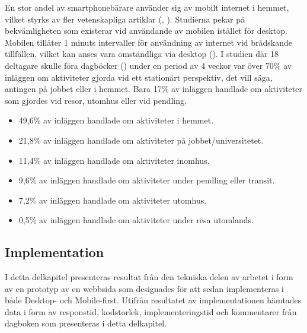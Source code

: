 \documentclass[11pt]{article}
\begin{document}
En stor andel av smartphonebärare använder sig av mobilt internet i hemmet, vilket styrks av fler vetenskapliga artiklar (\cite{mobilewebsearch}, \cite{mobilefirstluke}). Studierna pekar på bekvämligheten som existerar vid användande av mobilen istället för desktop. Mobilen tillåter 1 minuts intervaller för användning av internet vid brådskande tillfällen, vilket kan anses vara omständliga via desktop (\cite{mobilewebsearch}). I studien där 18 deltagare skulle föra dagböcker (\cite{mobilewebsearch}) under en period av 4 veckor var över 70\% av inläggen om aktiviteter gjorda vid ett stationärt perspektiv, det vill säga, antingen på jobbet eller i hemmet. Bara 17\% av inläggen handlade om aktiviteter som gjordes vid resor, utomhus eller vid pendling.
\\
\begin{itemize}
	\item{49,6\% av inläggen handlade om aktiviteter i hemmet.}
	\item{21,8\% av inläggen handlade om aktiviteter på jobbet/universitetet.}
	\item{11,4\% av inläggen handlade om aktiviteter inomhus.}
	\item{9,6\% av inläggen handlade om aktiviteter under pendling eller transit.}
	\item{7,2\% av inläggen handlade om aktiviteter utomhus.}
	\item{0,5\% av inläggen handlade om aktiviteter under resa utomlands.}
\end{itemize}
\bigskip

\subsection{Implementation}
I detta delkapitel presenteras resultat från den tekniska delen av arbetet i form av en prototyp av en webbsida som designades för att sedan implementeras  i både Desktop- och Mobile-first. Utifrån resultatet av implementationen hämtades data i form av responstid, kodstorlek, implementeringstid och kommentarer från dagboken som presenteras i detta delkapitel.
\end{document}
